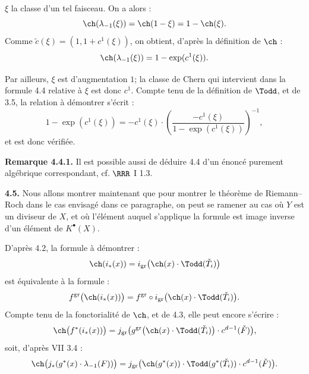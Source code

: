 
\(\xi\) la classe d'un tel faisceau. On a alors :
\[
 \ch(\lambda_{-1}(\xi))=\ch(1-\xi)=1-\ch(\xi).
\]
Comme \(\widetilde c(\xi)=(1,1+c^1(\xi))\), on obtient, d'après la définition de \(\ch\) :
\[
 \ch(\lambda_{-1}(\xi))=1-\exp(c^1(\xi)).
\]

Par ailleurs, \(\xi\) est d'augmentation \(1\); la classe de Chern qui intervient dans la formule 4.4 relative à \(\xi\) est donc \(c^1\). Compte tenu de la définition de \(\Todd\), et de 3.5, la relation à démontrer s'écrit :
\[
 1-\exp(c^1(\xi))
 =
 -c^1(\xi)\cdot\left(\frac{-c^1(\xi)}{1-\exp(c^1(\xi))}\right)^{-1},
\]
et est donc vérifiée.

\textbf{Remarque 4.4.1.} Il est possible aussi de déduire 4.4 d'un énoncé purement algébrique correspondant, cf. \(\RRR\) I 1.3.

\textbf{4.5.} Nous allons montrer maintenant que pour montrer le théorème de Riemann--Roch dans le cas envisagé dans ce paragraphe, on peut se ramener au cas où \(Y\) est un diviseur de \(X\), et où l'élément auquel s'applique la formule est image inverse d'un élément de \(K^{\bullet}(X)\).

D'après 4.2, la formule à démontrer :
\[
 \ch(i_*(x))=
 i_{\mathrm{gr}}\bigl(\ch(x)\cdot\Todd(\check T_i)\bigr)
\]
est équivalente à la formule :
\[
 f^{\mathrm{gr}}\bigl(\ch(i_*(x))\bigr)
 =
 f^{\mathrm{gr}}\circ i_{\mathrm{gr}}\bigl(\ch(x)\cdot\Todd(\check T_i)\bigr).
\]
Compte tenu de la fonctorialité de \(\ch\), et de 4.3, elle peut encore s'écrire :
\[
 \ch\bigl(f^*(i_*(x))\bigr)
 =
 j_{\mathrm{gr}}\bigl(g^{\mathrm{gr}}\bigl(\ch(x)\cdot\Todd(\check T_i)\bigr)\cdot c^{d-1}(\check F)\bigr),
\]
soit, d'après VII 3.4 :
\[
 \ch\bigl(j_*(g^*(x)\cdot\lambda_{-1}(F))\bigr)
 =
 j_{\mathrm{gr}}\bigl(\ch(g^*(x))\cdot\Todd(g^*(\check T_i))\cdot c^{d-1}(\check F)\bigr).
\]

